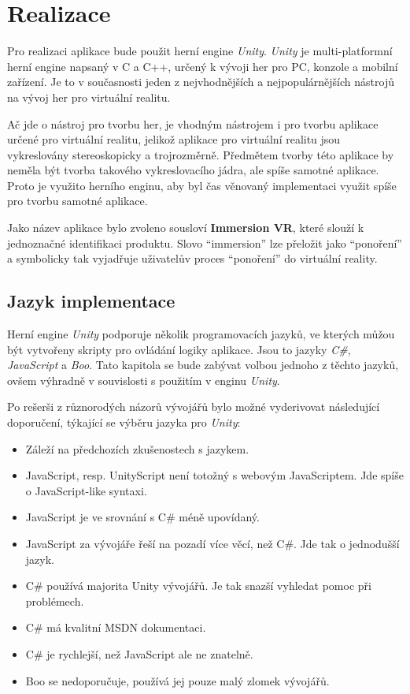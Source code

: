 \section{Realizace}\label{realizace}

Pro realizaci aplikace bude použit herní engine \emph{Unity}.
\emph{Unity} je multi-platformní herní engine napsaný v C a C++, určený
k vývoji her pro PC, konzole a mobilní zařízení. Je to v současnosti
jeden z nejvhodnějších a nejpopulárnějších nástrojů na vývoj her pro
virtuální realitu.

Ač jde o nástroj pro tvorbu her, je vhodným nástrojem i pro tvorbu
aplikace určené pro virtuální realitu, jelikož aplikace pro virtuální
realitu jsou vykreslovány stereoskopicky a trojrozměrně. Předmětem
tvorby této aplikace by neměla být tvorba takového vykreslovacího jádra,
ale spíše samotné aplikace. Proto je využito herního enginu, aby byl čas
věnovaný implementaci využit spíše pro tvorbu samotné aplikace.

Jako název aplikace bylo zvoleno sousloví \textbf{Immersion VR}, které
slouží k jednoznačné identifikaci produktu. Slovo ``immersion'' lze
přeložit jako ``ponoření'' a symbolicky tak vyjadřuje uživatelův proces
``ponoření'' do virtuální reality.

\subsection{Jazyk implementace}\label{jazyk-implementace}

Herní engine \emph{Unity} podporuje několik programovacích jazyků, ve
kterých můžou být vytvořeny skripty pro ovládání logiky aplikace. Jsou
to jazyky \emph{C\#}, \emph{JavaScript} a \emph{Boo}. Tato kapitola se
bude zabývat volbou jednoho z těchto jazyků, ovšem výhradně v
souvislosti s použitím v enginu \emph{Unity}.

Po rešerši z různorodých názorů vývojářů bylo možné vyderivovat
následující doporučení, týkající se výběru jazyka pro \emph{Unity}:

\begin{itemize}
\tightlist
\item
  Záleží na předchozích zkušenostech s jazykem.
\item
  JavaScript, resp. UnityScript není totožný s webovým JavaScriptem. Jde
  spíše o JavaScript-like syntaxi.
\item
  JavaScript je ve srovnání s C\# méně upovídaný.
\item
  JavaScript za vývojáře řeší na pozadí více věcí, než C\#. Jde tak o
  jednodušší jazyk.
\item
  C\# používá majorita Unity vývojářů. Je tak snazší vyhledat pomoc při
  problémech.
\item
  C\# má kvalitní MSDN dokumentaci.
\item
  C\# je rychlejší, než JavaScript ale ne znatelně.
\item
  Boo se nedoporučuje, používá jej pouze malý zlomek vývojářů.
\end{itemize}

